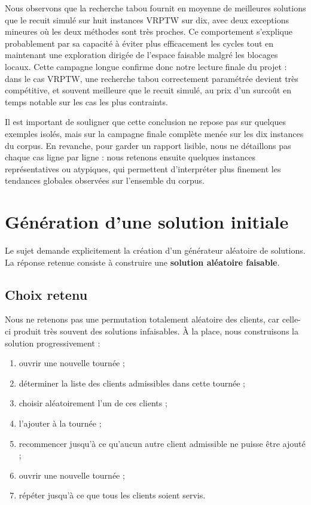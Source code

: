 \documentclass[11pt,a4paper]{article}
\begin{document}
Nous observons que la recherche tabou fournit en moyenne de meilleures solutions que le recuit simulé sur huit instances VRPTW sur dix, avec deux exceptions mineures où les deux méthodes sont très proches. Ce comportement s'explique probablement par sa capacité à éviter plus efficacement les cycles tout en maintenant une exploration dirigée de l'espace faisable malgré les blocages locaux. Cette campagne longue confirme donc notre lecture finale du projet : dans le cas VRPTW, une recherche tabou correctement paramétrée devient très compétitive, et souvent meilleure que le recuit simulé, au prix d'un surcoût en temps notable sur les cas les plus contraints.

Il est important de souligner que cette conclusion ne repose pas sur quelques exemples isolés, mais sur la campagne finale complète menée sur les dix instances du corpus. En revanche, pour garder un rapport lisible, nous ne détaillons pas chaque cas ligne par ligne : nous retenons ensuite quelques instances représentatives ou atypiques, qui permettent d'interpréter plus finement les tendances globales observées sur l'ensemble du corpus.

\section{Génération d'une solution initiale}

Le sujet demande explicitement la création d'un générateur aléatoire de solutions. La réponse retenue consiste à construire une \textbf{solution aléatoire faisable}.

\subsection{Choix retenu}
Nous ne retenons pas une permutation totalement aléatoire des clients, car celle-ci produit très souvent des solutions infaisables. À la place, nous construisons la solution progressivement :

\begin{enumerate}[label=\arabic*.]
    \item ouvrir une nouvelle tournée ;
    \item déterminer la liste des clients admissibles dans cette tournée ;
    \item choisir aléatoirement l'un de ces clients ;
    \item l'ajouter à la tournée ;
    \item recommencer jusqu'à ce qu'aucun autre client admissible ne puisse être ajouté ;
    \item ouvrir une nouvelle tournée ;
    \item répéter jusqu'à ce que tous les clients soient servis.
\end{enumerate}
\end{document}
